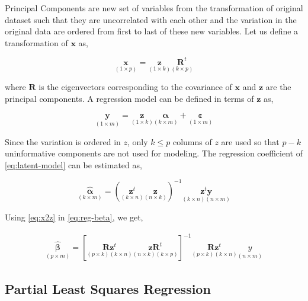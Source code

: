 \documentclass[12pt,3p,authoryear]{elsarticle}
\begin{document}
Principal Components are new set of variables from the transformation of
original dataset such that they are uncorrelated with each other and the
variation in the original data are ordered from first to last of these
new variables. Let us define a transformation of \(\mathbf{x}\) as,

\begin{equation}
\underset{(1\times p)}{\mathbf{x}} =
  \underset{(1 \times k)}{\mathbf{z}}
  \underset{(k \times p)}{\mathbf{R}^t}
\label{eq:x2z}
\end{equation}

where \(\mathbf{R}\) is the eigenvectors corresponding to the covariance
of \(\mathbf{x}\) and \(\mathbf{z}\) are the principal components. A
regression model can be defined in terms of \(\mathbf{z}\) as,

\begin{equation}
\underset{(1 \times m)}{\mathbf{y}} =
  \underset{(1 \times k)}{\mathbf{z}}
    \underset{(k \times m)}{\boldsymbol{\alpha}} +
  \underset{(1 \times m)}{\boldsymbol{\varepsilon}}
\label{eq:latent-model}
\end{equation}

Since the variation is ordered in \(z\), only \(k\le p\) columns of
\(z\) are used so that \(p-k\) uninformative components are not used for
modeling. The regression coefficient of \eqref{eq:latent-model} can be
estimated as,

\begin{equation}
\underset{(k\times m)}{\boldsymbol{\hat{\alpha}}} =
  \left(\underset{(k \times n)}{\mathbf{z}^t}
    \underset{(n \times k)}{\mathbf{z}}\right)^{-1}
  \underset{(k \times n)(n \times m)}{\mathbf{z}^t\mathbf{y}}
\label{eq:reg-alpha}
\end{equation}

Using \eqref{eq:x2z} in \eqref{eq:reg-beta}, we get,

\[
\begin{aligned}
\underset{(p\times m)}{\boldsymbol{\hat{\beta}}} =
  \left[
    \underset{(p\times k)(k \times n)}{\mathbf{R}\mathbf{z}^t}
    \underset{(n\times k)(k \times p)}{\mathbf{z} \mathbf{R}^t}
  \right]^{-1}
  \underset{(p\times k)(k \times n)}{\mathbf{R}\mathbf{z}^t}
  \underset{(n\times m)}{y}
\end{aligned}
\]

\subsection{Partial Least Squares
Regression}\label{partial-least-squares-regression}
\end{document}
